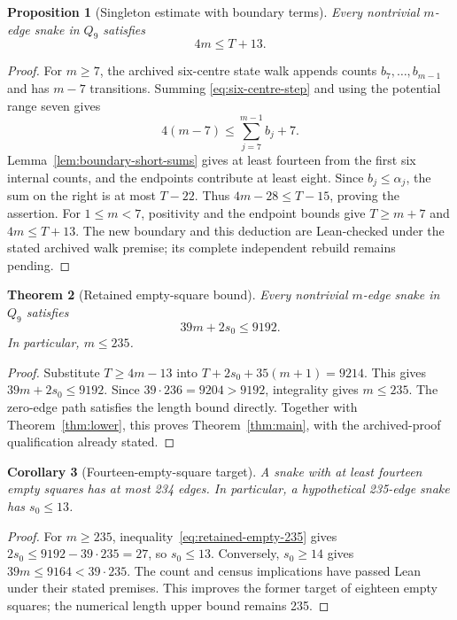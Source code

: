 \documentclass[11pt,a4paper]{article}
\newtheorem{theorem}{Theorem}[section]
\newtheorem{proposition}[theorem]{Proposition}
\newtheorem{corollary}[theorem]{Corollary}
\theoremstyle{definition}
\theoremstyle{remark}
\newcommand{\Q}{Q}
\begin{document}
\begin{proposition}[Singleton estimate with boundary terms]\label{prop:count-235}
Every nontrivial $m$-edge snake in $\Q_9$ satisfies
\begin{equation}\label{eq:count-235}
4m\le T+13.
\end{equation}
\end{proposition}
\begin{proof}
For $m\ge7$, the archived six-centre state walk appends counts
$b_7,\ldots,b_{m-1}$ and has $m-7$ transitions. Summing
\eqref{eq:six-centre-step} and using the potential range seven gives
\[
4(m-7)\le\sum_{j=7}^{m-1}b_j+7.
\]
Lemma~\ref{lem:boundary-short-sums} gives at least fourteen from the
first six internal counts, and the endpoints contribute at least eight.
Since $b_j\le\alpha_j$, the sum on the right is at most $T-22$.
Thus $4m-28\le T-15$, proving the assertion. For $1\le m<7$,
positivity and the endpoint bounds give $T\ge m+7$ and $4m\le T+13$.
The new boundary and this deduction are Lean-checked under the stated
archived walk premise; its complete independent rebuild remains pending.
\end{proof}

\begin{theorem}[Retained empty-square bound]\label{thm:upper235}
Every nontrivial $m$-edge snake in $\Q_9$ satisfies
\begin{equation}\label{eq:retained-empty-235}
\boxed{39m+2s_0\le9192.}
\end{equation}
In particular, $m\le235$.
\end{theorem}
\begin{proof}
Substitute $T\ge4m-13$ into $T+2s_0+35(m+1)=9214$.
This gives $39m+2s_0\le9192$. Since $39\cdot236=9204>9192$,
integrality gives $m\le235$. The zero-edge path satisfies the length
bound directly. Together with Theorem~\ref{thm:lower}, this proves
Theorem~\ref{thm:main}, with the archived-proof qualification already stated.
\end{proof}

\begin{corollary}[Fourteen-empty-square target]\label{cor:eighteen-empty}\label{cor:fourteen-empty}
A snake with at least fourteen empty squares has at most 234 edges.
In particular, a hypothetical 235-edge snake has $s_0\le13$.
\end{corollary}
\begin{proof}
For $m\ge235$, inequality~\eqref{eq:retained-empty-235} gives
$2s_0\le9192-39\cdot235=27$, so $s_0\le13$.
Conversely, $s_0\ge14$ gives $39m\le9164<39\cdot235$.
The count and census implications have passed Lean under their stated
premises. This improves the former target of eighteen empty squares;
the numerical length upper bound remains 235.
\end{proof}
\end{document}
